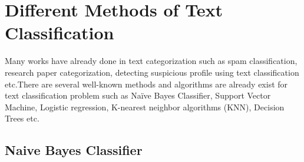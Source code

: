 \section{Different Methods of Text Classification}
Many works have already done in text categorization such as spam classification, research paper categorization, detecting suspicious profile using text classification etc.There are several well-known methods and algorithms are already exist for text classification problem such as Naïve Bayes Classifier\cite{yoo2015classification}, Support Vector Machine\cite{wei2012text, villmann2017can}, Logistic regression\cite{sharma2015active}, K-nearest neighbor algorithms (KNN)\cite{harisinghaney2014text}, Decision Trees\cite{chavan2014survey} etc.

\subsection{Naive Bayes Classifier}

